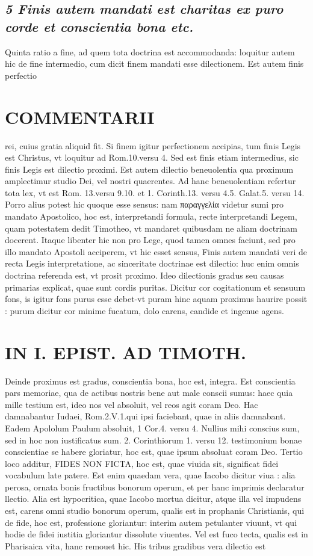 \documentclass{article}
\begin{document}
\begin{pages}
\subsection*{\textit{5 Finis autem mandati est charitas ex puro corde et conscientia bona etc. }}\pstart Quinta ratio a fine, ad quem tota doctrina est accommodanda: loquitur autem hic de fine intermedio, cum dicit finem mandati esse dilectionem. Est autem finis perfectio  \pend
\section*{COMMENTARII }
\marginpar{[ p.22 ]}\pstart rei, cuius gratia aliquid fit. Si finem igitur perfectionem accipias, tum finis Legis est Christus, vt loquitur ad Rom.10.versu 4. Sed est finis etiam intermedius, sic finis Legis est dilectio proximi. Est autem dilectio beneuolentia qua proximum amplectimur studio Dei, vel nostri quaerentes. Ad hanc beneuolentiam refertur tota lex, vt est Rom. 13.versu 9.10. et 1. Corinth.13. versu 4.5. Galat.5. versu 14. Porro alius potest hic quoque esse sensus: nam παραγγελία videtur sumi pro mandato Apostolico, hoc est, interpretandi formula, recte interpretandi Legem, quam potestatem dedit Timotheo, vt mandaret quibusdam ne aliam doctrinam docerent. Itaque libenter hic non pro Lege, quod tamen omnes faciunt, sed pro illo mandato Apostoli acciperem, vt hic esset sensus, Finis autem mandati veri de recta Legis interpretatione, ac sinceritate doctrinae est dilectio: huc enim omnis doctrina referenda est, vt prosit proximo. Ideo dilectionis gradus seu causas primarias explicat, quae sunt cordis puritas. Dicitur cor cogitationum et sensuum fons, is igitur fons purus esse debet-vt puram hinc aquam proximus haurire possit : purum dicitur cor minime fucatum, dolo carens, candide et ingenue agens.  \pend
\section*{IN I. EPIST. AD TIMOTH. }
\marginpar{[ p.23 ]}\pstart Deinde proximus est gradus, conscientia bona, hoc est, integra. Est conscientia pars memoriae, qua de actibus  nostris bene aut male conscii sumus: haec quia mille testium est, ideo nos vel absoluit, vel reos agit coram Deo. Hac damnabantur Iudaei, Rom.2.V.1.qui ipsi faciebant, quae in aliis damnabant. Eadem Apololum Paulum absoluit, 1 Cor.4. versu 4. Nullius mihi conscius sum, sed in hoc non iustificatus sum. 2. Corinthiorum 1. versu 12. testimonium bonae conscientiae se habere gloriatur, hoc est, quae ipsum absoluat coram Deo.  \pend\pstart Tertio loco additur, FIDES NON FICTA, hoc est, quae viuida sit, significat fidei vocabulum late patere. Est enim quaedam vera, quae Iacobo dicitur viua : alia perosa, ornata bonis fructibus bonorum operum, et per hanc imprimis declaratur llectio. Alia est hypocritica, quae Iacobo mortua dicitur, atque illa vel impudens est, carens omni studio bonorum operum, qualis est in prophanis Christianis, qui de fide, hoc est, professione gloriantur: interim autem petulanter viuunt, vt qui hodie de fidei iustitia gloriantur dissolute viuentes. Vel est fuco tecta, qualis est in Pharisaica vita, hanc remouet hic. His tribus gradibus vera dilectio est  \pend

\end{pages}
\end{document}
